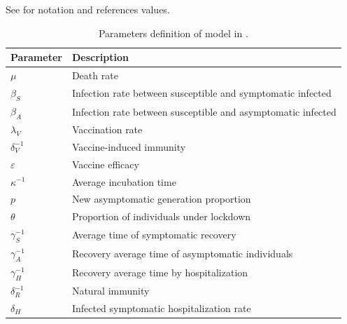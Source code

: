      See  for notation and references
     values.
\begin{table}[h!]
	\centering
	\begin{tabular}{>{\centering}%
        p{}%
        p{}
    }
    \toprule
		\textbf{Parameter} & \textbf{Description}
  	\\
  	\midrule
		$\mu$ &
			Death rate
		\\
        $\beta_S$ &
        	Infection rate between susceptible and symptomatic infected
		\\
        $\beta_A$ &
        	Infection rate between susceptible and asymptomatic infected
		\\
        $\lambda_V$ &
        	Vaccination rate
		\\
        $\delta_{V}^{-1}$ &
        Vaccine-induced immunity
		\\
        $\varepsilon$ &
        	Vaccine efficacy
		\\
        $\kappa^{-1}$ &
        	Average incubation time
        \\
		$p$ &
			New asymptomatic generation proportion
		\\
	    $\theta$ &
        	Proportion of individuals under lockdown
        \\
        $\gamma_{S}^{-1}$ &
        	Average time of symptomatic recovery
        \\
		$\gamma_{A}^{-1}$ &
			Recovery average time of asymptomatic individuals
		\\
		$\gamma_{H}^{-1}$ &
			Recovery average time by hospitalization
		\\
        $\delta_{R}^{-1}$ &
        	Natural immunity
  		\\
  		$\delta_{H}$ &
        	Infected symptomatic hospitalization rate
  		\\
  	\bottomrule
	\end{tabular}
		\caption{
			Parameters definition of model in
			.}
    \label{tbl:dynamics_base_parameters}
\end{table}
%

